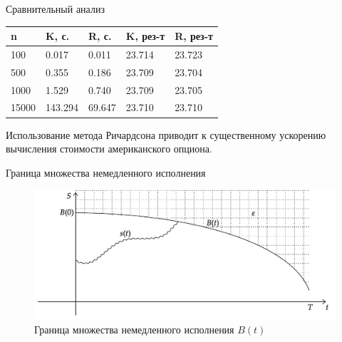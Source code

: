\documentclass[12pt]{beamer}
\begin{document}
\begin{frame}{Сравнительный анализ}
    \begin{table}[h]
        \caption{\label{tab:Richardson}Сравнение классического биномиального метода и метода Ричардсона ($S=120, K=100, T=0.5, \sigma=0.2, r=0.03, \delta=0.07$, истинное значение опциона --- $23.710$), где K --- классический биномиальный метод, а R --- метод Ричардсона}
        \begin{table}[]
            \begin{tabular}{|l|l|l|l|l|}
                \hline
                n     & K, с.       & R, с.       & K, рез-т    & R, рез-т\\ \hline
                100   & 0.017       & 0.011       & 23.714      & 23.723       \\ \hline
                500   & 0.355       & 0.186       & 23.709      & 23.704       \\ \hline
                1000  & 1.529       & 0.740       & 23.709      & 23.705       \\ \hline
                15000 & 143.294     & 69.647      & 23.710      & 23.710       \\ \hline
            \end{tabular}
        \end{table}
    \end{table}
    Использование метода Ричардсона приводит к существенному ускорению вычисления стоимости американского опциона.
\end{frame}


\begin{frame}{Граница множества немедленного исполнения}
        \begin{figure}[h!]
            \centering
            \includegraphics[scale=0.65]{Graph7.pdf}
            \caption{Граница множества немедленного исполнения $B(t)$}
            \label{boundary_of_set}
        \end{figure}
    \bigskip
\end{frame}
\end{document}
